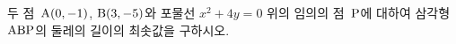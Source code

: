 두 점~$\mathrm{A}(0{,}\mkern3mu\mathopen{}-1)$, $\mathrm{B}(3{,}\mkern3mu\mathopen{}-5)$와 포물선 $x^2+4y=0$ 위의 임의의 점~$\mathrm{P}$에 대하여 삼각형~$\mathrm{ABP}$의 둘레의 길이의 최솟값을 구하시오.
